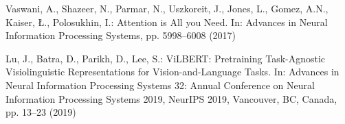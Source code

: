 \documentclass[runningheads]{llncs}
\begin{document}
\begin{thebibliography}{10}
	Vaswani, A., Shazeer, N., Parmar, N., Uszkoreit, J., Jones, L., Gomez, A.N., Kaiser, Ł., Polosukhin, I.: Attention is All you Need. In: Advances in Neural Information Processing Systems, pp. 5998--6008 (2017)

	Lu, J., Batra, D., Parikh, D., Lee, S.: ViLBERT: Pretraining Task-Agnostic Visiolinguistic Representations for Vision-and-Language Tasks. In: Advances in Neural Information Processing Systems 32: Annual Conference on Neural Information Processing Systems 2019, NeurIPS 2019, Vancouver, BC, Canada, pp. 13--23 (2019)

\end{thebibliography}
\end{document}
